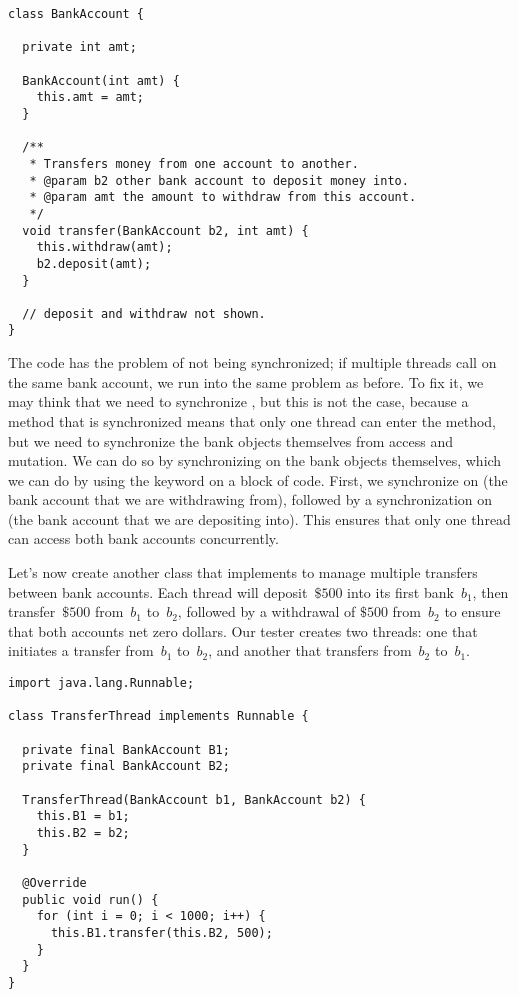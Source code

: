 \begin{lstlisting}[language=MyJava]
class BankAccount {

  private int amt;

  BankAccount(int amt) { 
    this.amt = amt; 
  }

  /**
   * Transfers money from one account to another.
   * @param b2 other bank account to deposit money into.
   * @param amt the amount to withdraw from this account.
   */
  void transfer(BankAccount b2, int amt) {
    this.withdraw(amt);
    b2.deposit(amt);
  }

  // deposit and withdraw not shown.
}
\end{lstlisting}

The code has the problem of not being synchronized; if multiple threads call  on the same bank account, we run into the same problem as before. 
To fix it, we may think that we need to synchronize , but this is not the case, because a method that is synchronized means that only one thread can enter the method, but we need to synchronize the bank objects themselves from access and mutation. 
We can do so by synchronizing on the bank objects themselves, which we can do by using the  keyword on a block of code. 
First, we synchronize on  (the bank account that we are withdrawing from), followed by a synchronization on  (the bank account that we are depositing into). 
This ensures that only one thread can access both bank accounts concurrently.

Let's now create another class that implements  to manage multiple transfers between bank accounts. 
Each thread will deposit~$\$500$ into its first bank~$b_1$, then transfer~$\$500$ from~$b_1$ to~$b_2$, followed by a withdrawal of $\$500$ from~$b_2$ to ensure that both accounts net zero dollars. 
Our tester creates two threads: one that initiates a transfer from~$b_1$ to~$b_2$, and another that transfers from~$b_2$ to~$b_1$.

\begin{lstlisting}[language=MyJava]
import java.lang.Runnable;

class TransferThread implements Runnable {

  private final BankAccount B1;
  private final BankAccount B2;

  TransferThread(BankAccount b1, BankAccount b2) {
    this.B1 = b1;
    this.B2 = b2;
  }

  @Override
  public void run() {
    for (int i = 0; i < 1000; i++) { 
      this.B1.transfer(this.B2, 500); 
    }
  }
}
\end{lstlisting}


